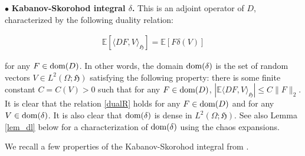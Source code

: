 \documentclass[letterpaper, 11pt,  reqno]{amsart}
\newcommand{\noi}{\noindent}
\newcommand{\bul}{\bullet}
\newcommand{\E}{\mathbb{E}}
\newcommand{\dl}{\delta}
\renewcommand{\O}{\Omega}
\newcommand{\jb}[1]
{\langle #1 \rangle}
\newcommand{\fH}{\mathfrak{H}}
\newcommand{\dom}{\textup{dom}}
\numberwithin{equation}{section}
\numberwithin{theorem}{section}
\begin{document}
\smallskip

\noi
$\bul$ {\bf Kabanov-Skorohod integral $\dl$.} This is an adjoint operator of $D$,
characterized by the following duality relation:

\noi
\begin{align}
\E[ \langle DF, V \rangle_\fH  ] = \E[ F \dl(V) ] 
\label{dualR}
\end{align}

\noi 
for any $F\in\dom(D)$. In other words, the domain $\dom(\dl)$
is the set of random vectors $V\in L^2(\O;\fH)$ satisfying the following
property:
there is some finite constant $C= C(V) >0$ such that 
for any $F\in\dom(D)$, $| \E\jb{DF, V}_\fH  | \leq C \| F\|_2$.
It is clear that the   relation \eqref{dualR} holds for any 
$F\in\dom(D)$ and for any $V\in\dom(\dl)$.
It is also clear that   $\dom(\dl)$ is  dense in $L^2(\O; \fH)$.  
See also Lemma \ref{lem_dl} below for a characterization of $\dom(\dl)$
using the chaos expansions. 

\smallskip



We recall a few properties of the Kabanov-Skorohod integral
from  \cite[Lemma 2.5]{BZ23}.
\end{document}
